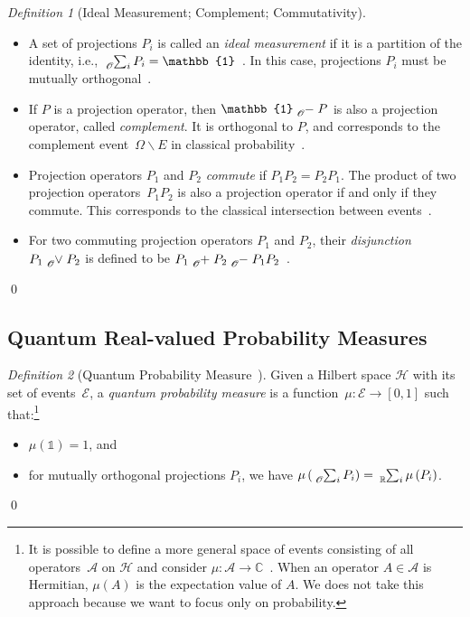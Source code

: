 \documentclass{article}
\theoremstyle{remark}
\newtheorem{definition}{Definition}
\newcommand{\events}{\ensuremath{\mathcal{E}}}
\newcommand{\Hilb}{\mathcal{H}}
\def\C{{\mathbb{C}}}
\begin{document}
\begin{definition}[Ideal Measurement; Complement; Commutativity]~ 
\begin{itemize}
\item A set of projections $P_{i}$ is called an \emph{ideal measurement}
if it is a partition of the identity, i.e., $\tensor*[_{\mathscr{O}}]{\sum}{_{i}}P_{i}=\mathbb{1}$~\cite{Swart2013}.
In this case, projections $P_{i}$ must be mutually orthogonal~\cite{Griffiths2003}.
\item If $P$ is a projection operator, then $\mathbb{1}\tensor*[_{\mathscr{O}}]{-}{}P$
is also a projection operator, called \emph{complement}. It is orthogonal
to $P$, and corresponds to the complement event~$\Omega\backslash E$
in classical probability~\cite{Griffiths2003}. 
\item Projection operators $P_{1}$ and $P_{2}$ \emph{commute} if $P_{1}P_{2}=P_{2}P_{1}$.
The product of two projection operators~$P_{1}P_{2}$ is also a projection
operator if and only if they commute. This corresponds to the classical
intersection between events~\cite{peres1995quantum,Griffiths2003}. 
\item For two commuting projection operators $P_{1}$ and $P_{2}$, their
\emph{disjunction}~$P_{1}\tensor*[_{\mathscr{O}}]{\vee}{}P_{2}$
is defined to be $P_{1}\tensor*[_{\mathscr{O}}]{+}{}P_{2}\tensor*[_{\mathscr{O}}]{-}{}P_{1}P_{2}$~\cite{Griffiths2003}. 
\end{itemize}
\qed\end{definition}

\subsection{Quantum Real-valued Probability Measures}

\begin{definition}[Quantum Probability
Measure~\cite{10.2307/2308516,gleason1957,Redhead1987-REDINA,Maassen2010}]\label{def:QuantumProbabilitySpace}
Given a Hilbert space $\Hilb$ with its set of events~$\events$, a
\emph{quantum probability measure} is a function~$\mu : \events \rightarrow
[0,1]$ such that:\footnote {It is possible to define a more general space of events consisting of
    all operators~$\mathcal{A}$ on $\Hilb$ and consider
    $\mu:\mathcal{A}\rightarrow\C$~\cite{Maassen2010,Swart2013}.  When
    an operator $A\in\mathcal{A}$ is Hermitian, $\mu\left(A\right)$ is
    the expectation value of $A$. We does not take this approach
    because we want to focus only on probability. }
\begin{itemize}
\item $\mu(\mathbb{1})=1$, and 
\item for mutually orthogonal projections $P_{i}$, we have 
$\mu\left(\tensor*[_{\mathscr{O}}]{\sum}{_{i}}P_{i}\right)=\tensor*[_{\mathbb{R}}]{\sum}{_{i}}\mu\left(P_{i}\right)$.
\end{itemize}
\qed\end{definition}
\end{document}
